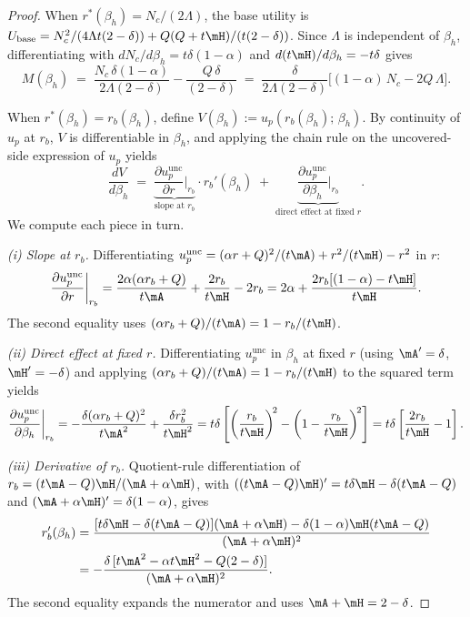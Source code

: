 \begin{proof}
When $r^*(\beta_h) = N_c/(2\Lambda)$, the base utility is $U_{\mathrm{base}} = N_c^2/(4\Lambda t(2-\delta)) + Q(Q + t\mH)/(t(2-\delta))$. Since $\Lambda$ is independent of $\beta_h$, differentiating with $dN_c/d\beta_h = t\delta(1-\alpha)$ and $d(t\mH)/d\beta_h = -t\delta$ gives
\[
    M(\beta_h) \;=\; \frac{N_c\,\delta(1-\alpha)}{2\Lambda (2-\delta)} - \frac{Q\,\delta}{(2-\delta)} \;=\; \frac{\delta}{2\Lambda (2-\delta)}\bigl[(1-\alpha)\,N_c - 2Q\,\Lambda\bigr].
\]
 
When $r^*(\beta_h) = r_b(\beta_h)$, define $V(\beta_h) := u_p(r_b(\beta_h);\,\beta_h)$. By continuity of $u_p$ at $r_b$, $V$ is differentiable in $\beta_h$, and applying the chain rule on the uncovered-side expression of $u_p$ yields
\[
    \frac{dV}{d\beta_h} \;=\; \underbrace{\frac{\partial u_p^{\mathrm{unc}}}{\partial r}\bigg|_{r_b}}_{\text{slope at } r_b} \cdot r_b'(\beta_h) \;+\; \underbrace{\frac{\partial u_p^{\mathrm{unc}}}{\partial \beta_h}\bigg|_{r_b}}_{\text{direct effect at fixed } r}.
\]
We compute each piece in turn.
 
\emph{(i) Slope at $r_b$.} Differentiating $u_p^{\mathrm{unc}} = (\alpha r + Q)^2/(t\mA) + r^2/(t\mH) - r^2$ in $r$:
\[
    \frac{\partial u_p^{\mathrm{unc}}}{\partial r}\bigg|_{r_b} = \frac{2\alpha(\alpha r_b + Q)}{t\mA} + \frac{2r_b}{t\mH} - 2r_b = 2\alpha + \frac{2r_b[(1-\alpha) - t\mH]}{t\mH}.
\]
The second equality uses $(\alpha r_b + Q)/(t\mA) = 1 - r_b/(t\mH)$.
 
\emph{(ii) Direct effect at fixed $r$.} Differentiating $u_p^{\mathrm{unc}}$ in $\beta_h$ at fixed $r$ (using $\mA' = \delta$, $\mH' = -\delta$) and applying $(\alpha r_b + Q)/(t\mA) = 1 - r_b/(t\mH)$ to the squared term yields
\[
    \frac{\partial u_p^{\mathrm{unc}}}{\partial \beta_h}\bigg|_{r_b} = -\frac{\delta(\alpha r_b + Q)^2}{t\mA^2} + \frac{\delta r_b^2}{t\mH^2} = t\delta\left[\left(\frac{r_b}{t\mH}\right)^{\!2} - \left(1 - \frac{r_b}{t\mH}\right)^{\!2}\right] = t\delta\left[\frac{2r_b}{t\mH} - 1\right].
\]
 
\emph{(iii) Derivative of $r_b$.} Quotient-rule differentiation of $r_b = (t\mA - Q)\mH/(\mA+\alpha\mH)$, with $((t\mA-Q)\mH)' = t\delta\mH - \delta(t\mA-Q)$ and $(\mA+\alpha\mH)' = \delta(1-\alpha)$, gives
\begin{align*}
    r_b'(\beta_h) &= \frac{[t\delta\mH - \delta(t\mA-Q)](\mA+\alpha\mH) - \delta(1-\alpha)\mH(t\mA-Q)}{(\mA+\alpha\mH)^2} \\
    &= -\frac{\delta\,[t\mA^2 - \alpha t\mH^2 - Q(2-\delta)]}{(\mA+\alpha\mH)^2}.
\end{align*}
The second equality expands the numerator and uses $\mA + \mH = 2-\delta$.
 

\end{proof}
